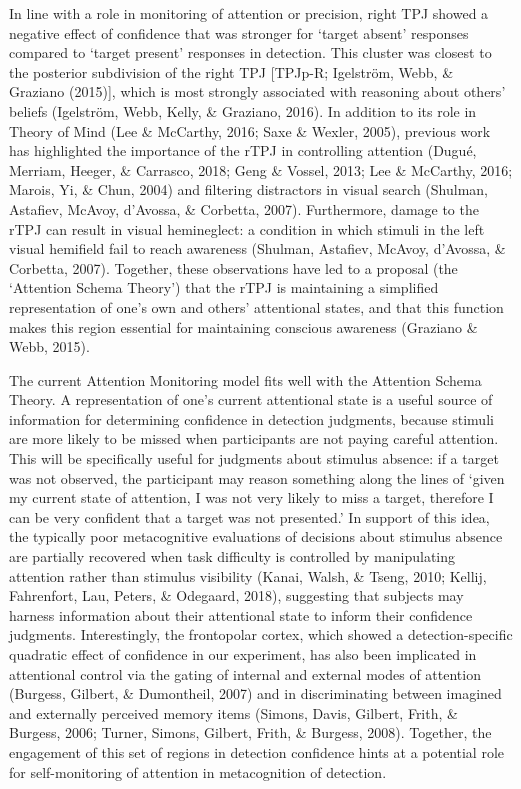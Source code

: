\documentclass[12pt,twoside]{reedthesis}
\begin{document}
In line with a role in monitoring of attention or precision, right TPJ showed a negative effect of confidence that was stronger for `target absent' responses compared to `target present' responses in detection. This cluster was closest to the posterior subdivision of the right TPJ {[}TPJp-R; Igelström, Webb, \& Graziano (2015){]}, which is most strongly associated with reasoning about others' beliefs (Igelström, Webb, Kelly, \& Graziano, 2016). In addition to its role in Theory of Mind (Lee \& McCarthy, 2016; Saxe \& Wexler, 2005), previous work has highlighted the importance of the rTPJ in controlling attention (Dugué, Merriam, Heeger, \& Carrasco, 2018; Geng \& Vossel, 2013; Lee \& McCarthy, 2016; Marois, Yi, \& Chun, 2004) and filtering distractors in visual search (Shulman, Astafiev, McAvoy, d'Avossa, \& Corbetta, 2007). Furthermore, damage to the rTPJ can result in visual hemineglect: a condition in which stimuli in the left visual hemifield fail to reach awareness (Shulman, Astafiev, McAvoy, d'Avossa, \& Corbetta, 2007). Together, these observations have led to a proposal (the `Attention Schema Theory') that the rTPJ is maintaining a simplified representation of one's own and others' attentional states, and that this function makes this region essential for maintaining conscious awareness (Graziano \& Webb, 2015).

The current Attention Monitoring model fits well with the Attention Schema Theory. A representation of one's current attentional state is a useful source of information for determining confidence in detection judgments, because stimuli are more likely to be missed when participants are not paying careful attention. This will be specifically useful for judgments about stimulus absence: if a target was not observed, the participant may reason something along the lines of `given my current state of attention, I was not very likely to miss a target, therefore I can be very confident that a target was not presented.' In support of this idea, the typically poor metacognitive evaluations of decisions about stimulus absence are partially recovered when task difficulty is controlled by manipulating attention rather than stimulus visibility (Kanai, Walsh, \& Tseng, 2010; Kellij, Fahrenfort, Lau, Peters, \& Odegaard, 2018), suggesting that subjects may harness information about their attentional state to inform their confidence judgments. Interestingly, the frontopolar cortex, which showed a detection-specific quadratic effect of confidence in our experiment, has also been implicated in attentional control via the gating of internal and external modes of attention (Burgess, Gilbert, \& Dumontheil, 2007) and in discriminating between imagined and externally perceived memory items (Simons, Davis, Gilbert, Frith, \& Burgess, 2006; Turner, Simons, Gilbert, Frith, \& Burgess, 2008). Together, the engagement of this set of regions in detection confidence hints at a potential role for self-monitoring of attention in metacognition of detection.
\end{document}
